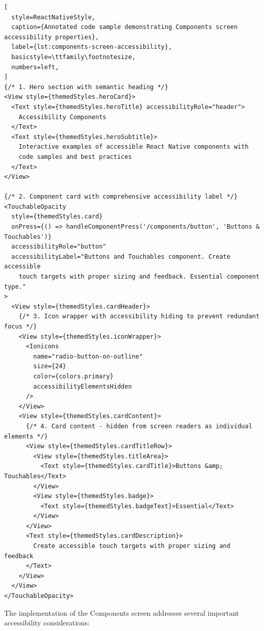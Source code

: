 \begin{lstlisting}[
  style=ReactNativeStyle,
  caption={Annotated code sample demonstrating Components screen accessibility properties},
  label={lst:components-screen-accessibility},
  basicstyle=\ttfamily\footnotesize,
  numbers=left,
]
{/* 1. Hero section with semantic heading */}
<View style={themedStyles.heroCard}>
  <Text style={themedStyles.heroTitle} accessibilityRole="header">
    Accessibility Components
  </Text>
  <Text style={themedStyles.heroSubtitle}>
    Interactive examples of accessible React Native components with 
    code samples and best practices
  </Text>
</View>

{/* 2. Component card with comprehensive accessibility label */}
<TouchableOpacity
  style={themedStyles.card}
  onPress={() => handleComponentPress('/components/button', 'Buttons & Touchables')}
  accessibilityRole="button"
  accessibilityLabel="Buttons and Touchables component. Create accessible 
    touch targets with proper sizing and feedback. Essential component type."
>
  <View style={themedStyles.cardHeader}>
    {/* 3. Icon wrapper with accessibility hiding to prevent redundant focus */}
    <View style={themedStyles.iconWrapper}>
      <Ionicons
        name="radio-button-on-outline"
        size={24}
        color={colors.primary}
        accessibilityElementsHidden
      />
    </View>
    <View style={themedStyles.cardContent}>
      {/* 4. Card content - hidden from screen readers as individual elements */}
      <View style={themedStyles.cardTitleRow}>
        <View style={themedStyles.titleArea}>
          <Text style={themedStyles.cardTitle}>Buttons &amp; Touchables</Text>
        </View>
        <View style={themedStyles.badge}>
          <Text style={themedStyles.badgeText}>Essential</Text>
        </View>
      </View>
      <Text style={themedStyles.cardDescription}>
        Create accessible touch targets with proper sizing and feedback
      </Text>
    </View>
  </View>
</TouchableOpacity>
\end{lstlisting}

\FloatBarrier

The implementation of the Components screen addresses several important accessibility considerations:

